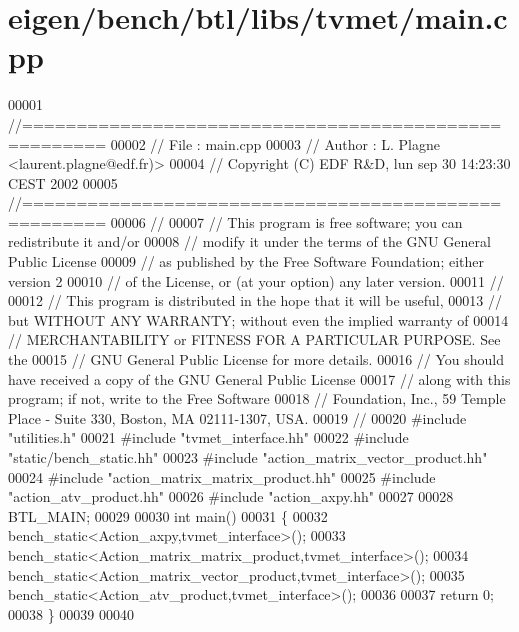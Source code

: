 \hypertarget{eigen_2bench_2btl_2libs_2tvmet_2main_8cpp_source}{}\section{eigen/bench/btl/libs/tvmet/main.cpp}
\label{eigen_2bench_2btl_2libs_2tvmet_2main_8cpp_source}

\begin{DoxyCode}
00001 \textcolor{comment}{//=====================================================}
00002 \textcolor{comment}{// File   :  main.cpp}
00003 \textcolor{comment}{// Author :  L. Plagne <laurent.plagne@edf.fr)>}
00004 \textcolor{comment}{// Copyright (C) EDF R&D,  lun sep 30 14:23:30 CEST 2002}
00005 \textcolor{comment}{//=====================================================}
00006 \textcolor{comment}{//}
00007 \textcolor{comment}{// This program is free software; you can redistribute it and/or}
00008 \textcolor{comment}{// modify it under the terms of the GNU General Public License}
00009 \textcolor{comment}{// as published by the Free Software Foundation; either version 2}
00010 \textcolor{comment}{// of the License, or (at your option) any later version.}
00011 \textcolor{comment}{//}
00012 \textcolor{comment}{// This program is distributed in the hope that it will be useful,}
00013 \textcolor{comment}{// but WITHOUT ANY WARRANTY; without even the implied warranty of}
00014 \textcolor{comment}{// MERCHANTABILITY or FITNESS FOR A PARTICULAR PURPOSE.  See the}
00015 \textcolor{comment}{// GNU General Public License for more details.}
00016 \textcolor{comment}{// You should have received a copy of the GNU General Public License}
00017 \textcolor{comment}{// along with this program; if not, write to the Free Software}
00018 \textcolor{comment}{// Foundation, Inc., 59 Temple Place - Suite 330, Boston, MA  02111-1307, USA.}
00019 \textcolor{comment}{//}
00020 \textcolor{preprocessor}{#include "utilities.h"}
00021 \textcolor{preprocessor}{#include "tvmet\_interface.hh"}
00022 \textcolor{preprocessor}{#include "static/bench\_static.hh"}
00023 \textcolor{preprocessor}{#include "action\_matrix\_vector\_product.hh"}
00024 \textcolor{preprocessor}{#include "action\_matrix\_matrix\_product.hh"}
00025 \textcolor{preprocessor}{#include "action\_atv\_product.hh"}
00026 \textcolor{preprocessor}{#include "action\_axpy.hh"}
00027 
00028 BTL\_MAIN;
00029 
00030 \textcolor{keywordtype}{int} main()
00031 \{
00032   bench\_static<Action\_axpy,tvmet\_interface>();
00033   bench\_static<Action\_matrix\_matrix\_product,tvmet\_interface>();
00034   bench\_static<Action\_matrix\_vector\_product,tvmet\_interface>();
00035   bench\_static<Action\_atv\_product,tvmet\_interface>();
00036 
00037   \textcolor{keywordflow}{return} 0;
00038 \}
00039 
00040 
\end{DoxyCode}
